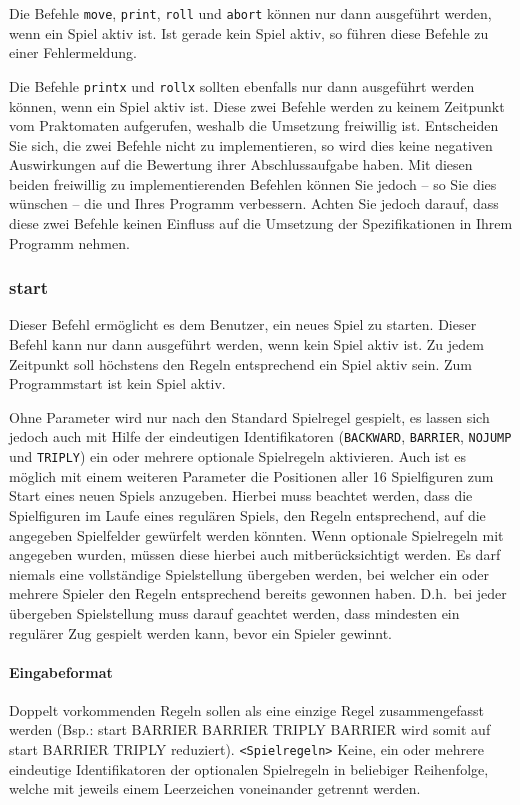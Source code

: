 Die Befehle \texttt{move}, \texttt{print}, \texttt{roll} und \texttt{abort} können nur dann ausgeführt werden, wenn ein Spiel aktiv ist. Ist gerade kein Spiel aktiv, so führen diese Befehle zu einer Fehlermeldung.

Die Befehle \texttt{printx} und \texttt{rollx} sollten ebenfalls nur dann ausgeführt werden können, wenn ein Spiel aktiv ist. Diese zwei Befehle werden zu keinem Zeitpunkt vom Praktomaten aufgerufen, weshalb die Umsetzung freiwillig ist. Entscheiden Sie sich, die zwei Befehle nicht zu implementieren, so wird dies keine negativen Auswirkungen auf die Bewertung ihrer Abschlussaufgabe haben. Mit diesen beiden freiwillig zu implementierenden Befehlen können Sie jedoch -- so Sie dies wünschen -- die  und  Ihres Programm verbessern. Achten Sie jedoch darauf, dass diese zwei Befehle keinen Einfluss auf die Umsetzung der Spezifikationen in Ihrem Programm nehmen.


\subsubsection*{start}
Dieser Befehl ermöglicht es dem Benutzer, ein neues Spiel zu starten. Dieser Befehl kann nur dann ausgeführt werden, wenn kein Spiel aktiv ist. Zu jedem Zeitpunkt soll höchstens den Regeln entsprechend ein Spiel aktiv sein. Zum Programmstart ist kein Spiel aktiv.

Ohne Parameter wird nur nach den Standard Spielregel gespielt, es lassen sich jedoch auch mit Hilfe der eindeutigen Identifikatoren (\texttt{BACKWARD}, \texttt{BARRIER}, \texttt{NOJUMP} und \texttt{TRIPLY}) ein oder mehrere optionale Spielregeln aktivieren. 
Auch ist es möglich mit einem weiteren Parameter die Positionen aller 16 Spielfiguren zum Start eines neuen Spiels anzugeben. Hierbei muss beachtet werden, dass die Spielfiguren im Laufe eines regulären Spiels, den Regeln entsprechend, auf die angegeben Spielfelder gewürfelt werden könnten. Wenn optionale Spielregeln mit angegeben wurden, müssen diese hierbei auch mitberücksichtigt werden. Es darf niemals eine vollständige Spielstellung übergeben werden, bei welcher ein oder mehrere Spieler den Regeln entsprechend bereits gewonnen haben. D.h.~bei jeder übergeben Spielstellung muss darauf geachtet werden, dass mindesten ein regulärer Zug gespielt werden kann, bevor ein Spieler gewinnt. 

\paragraph*{Eingabeformat}
Doppelt vorkommenden Regeln sollen als eine einzige Regel zusammengefasst werden (Bsp.: start BARRIER BARRIER TRIPLY BARRIER wird somit auf start BARRIER TRIPLY reduziert).
\texttt{<Spielregeln>} Keine, ein oder mehrere eindeutige Identifikatoren der optionalen Spielregeln in beliebiger Reihenfolge, welche mit jeweils einem Leerzeichen voneinander getrennt werden.


